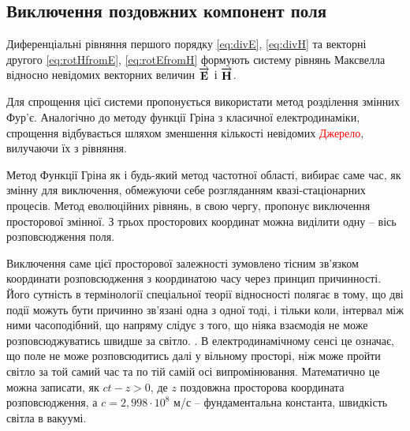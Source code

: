 \subsection{Виключення поздовжних компонент поля}

Диференціальні рівняння першого порядку \eqref{eq:divE}, \eqref{eq:divH} та 
векторні другого \eqref{eq:rotHfromE}, \eqref{eq:rotEfromH} формують систему 
рівнянь Максвелла відносно невідомих векторних величин $ \overrightarrow{\mathbf E} $ і 
$ \overrightarrow{\mathbf H} $.

Для спрощення цієї системи пропонується використати метод розділення змінних
Фур'є. Аналогічно до методу функції Гріна з класичної електродинаміки, 
спрощення відбувається шляхом зменшення кількості невідомих 
\textcolor{red}{Джерело}, вилучаючи їх з рівняння. 

Метод Функції Гріна як і будь-який метод частотної області, вибирає саме час, 
як змінну для виключення, обмежуючи себе розгляданням квазі-стаціонарних 
процесів. Метод еволюційних рівнянь, в свою чергу, пропонує виключення 
просторової змінної. З трьох просторових координат можна виділити одну -- вісь 
розповсюдження поля. 

Виключення саме цієї просторової залежності зумовлено тісним зв'язком 
координати розповсюдження з координатою часу через принцип причинності. Його 
сутність в термінології спеціальної теорії відносності полягає в тому, що дві 
події можуть бути причинно зв'язані одна з одної тоді, і тільки коли, інтервал 
між ними часоподібний, що напряму слідує з того, що ніяка взаємодія не може 
розповсюджуватись швидше за світло. \cite[ст. 22]{imp:LandauII}. В 
електродинамічному сенсі це означає, що поле не може розповсюдитись далі у 
вільному просторі, ніж може пройти світло за той самий час та по тій самій осі 
випромінювання. Математично це можна записати, як $ ct - z > 0 $, де $ z $
поздовжна просторова координата розповсюдження, а $ c = 2,998 \cdot 10^8 $ м/с 
-- фундаментальна константа, швидкість світла в вакуумі.

